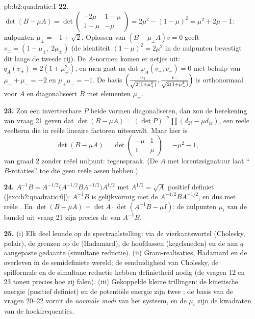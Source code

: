 \begin{solution}{pb:b2:quadratic:1}
\textbf{22.} $\det(B - \mu A) =
\det\begin{pmatrix} -2\mu & 1-\mu\\ 1-\mu & -\mu\end{pmatrix}
= 2\mu^2 - (1-\mu)^2 = \mu^2 + 2\mu - 1$: nulpunten $\mu_\pm = -1
\pm \sqrt2$. Oplossen van $(B - \mu_\pm A)v = 0$ geeft $v_\pm = (1
- \mu_\pm,\ 2\mu_\pm)$ (de identiteit $(1-\mu)^2 = 2\mu^2$ in de
nulpunten bevestigt dit langs de tweede rij). De $A$-normen komen
er netjes uit: $q_A(v_\pm) = 2(1 + \mu_\pm^2)$, en men gaat na dat
$\varphi_A(v_+, v_-) = 0$ met behulp van $\mu_+ + \mu_- = -2$ en
$\mu_+\mu_- = -1$. De basis $\Bigl(\frac{v_+}{\sqrt{2(1 +
\mu_+^2)}}, \frac{v_-}{\sqrt{2(1+\mu_-^2)}}\Bigr)$ is orthonormaal
voor $A$ en diagonaliseert $B$ met elementen $\mu_\pm$.

\textbf{23.} Zou een inverteerbare $P$ beide vormen
diagonaliseren, dan zou de berekening van vraag 21 geven dat
$\det(B - \mu A) = (\det P)^{-2}\prod(d_{2i} - \mu d_{1i})$, een
reële veelterm die in reële lineaire factoren uiteenvalt. Maar hier
is
\[
\det(B - \mu A) = \det\begin{pmatrix} -\mu & 1\\ 1 &
\mu\end{pmatrix} = -\mu^2 - 1 ,
\]
van graad $2$ zonder reëel nulpunt: tegenspraak. (De $A$ met
lorentzsignatuur laat ``$B$-rotaties'' toe die geen reële assen
hebben.)

\textbf{24.} $A^{-1}B = A^{-1/2}\bigl(A^{-1/2}BA^{-1/2}\bigr)
A^{1/2}$ met $A^{1/2} = \sqrt A$ positief definiet
(\cref{exo:b2:quadratic:6}): $A^{-1}B$ is gelijkvormig met de
\emph{} $A^{-1/2}BA^{-1/2}$, en dus 
met reële . En $\det(B - \mu A) = \det A\cdot
\det(A^{-1}B - \mu I)$: de nulpunten $\mu_i$ van de bundel uit
vraag 21 zijn precies de  van $A^{-1}B$.

\textbf{25.} (i) Elk deel leunde op de spectraalstelling: via de
vierkantswortel (Cholesky, polair), de grenzen op de 
(Hadamard), de hoofdassen (kegelsneden) en de aan $q$ aangepaste
gedaante (simultane reductie). (ii) Gram-realisaties, Hadamard en
de  overleven in de semidefiniete wereld; de
eenduidigheid van Cholesky, de spilformule en de simultane reductie
hebben definietheid nodig (de vragen 12 en 23 tonen precies hoe zij
falen). (iii) Gekoppelde kleine trillingen: de kinetische energie
(positief definiet) en de potentiële energie zijn twee ; de basis van de vragen 20--22 vormt de \emph{normale modi}
van het systeem, en de $\mu_i$ zijn de kwadraten van de
hoekfrequenties.
\end{solution}

